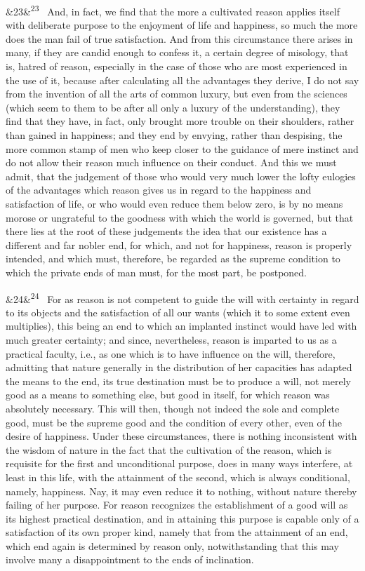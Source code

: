 \documentclass[12pt]{article}
\newcommand{\para}[1][]{\par\noindent\ifx&#1&\else\textsuperscript{\footnotesize #1}~\fi}
\begin{document}
\para[23] And, in fact, we find that the more a cultivated reason applies itself with deliberate purpose to the enjoyment of life and happiness, so much the more does the man fail of true satisfaction. And from this circumstance there arises in many, if they are candid enough to confess it, a certain degree of misology, that is, hatred of reason, especially in the case of those who are most experienced in the use of it, because after calculating all the advantages they derive, I do not say from the invention of all the arts of common luxury, but even from the sciences (which seem to them to be after all only a luxury of the understanding), they find that they have, in fact, only brought more trouble on their shoulders, rather than gained in happiness; and they end by envying, rather than despising, the more common stamp of men who keep closer to the guidance of mere instinct and do not allow their reason much influence on their conduct. And this we must admit, that the judgement of those who would very much lower the lofty eulogies of the advantages which reason gives us in regard to the happiness and satisfaction of life, or who would even reduce them below zero, is by no means morose or ungrateful to the goodness with which the world is governed, but that there lies at the root of these judgements the idea that our existence has a different and far nobler end, for which, and not for happiness, reason is properly intended, and which must, therefore, be regarded as the supreme condition to which the private ends of man must, for the most part, be postponed.

\para[24] For as reason is not competent to guide the will with certainty in regard to its objects and the satisfaction of all our wants (which it to some extent even multiplies), this being an end to which an implanted instinct would have led with much greater certainty; and since, nevertheless, reason is imparted to us as a practical faculty, i.e., as one which is to have influence on the will, therefore, admitting that nature generally in the distribution of her capacities has adapted the means to the end, its true destination must be to produce a will, not merely good as a means to something else, but good in itself, for which reason was absolutely necessary. This will then, though not indeed the sole and complete good, must be the supreme good and the condition of every other, even of the desire of happiness. Under these circumstances, there is nothing inconsistent with the wisdom of nature in the fact that the cultivation of the reason, which is requisite for the first and unconditional purpose, does in many ways interfere, at least in this life, with the attainment of the second, which is always conditional, namely, happiness. Nay, it may even reduce it to nothing, without nature thereby failing of her purpose. For reason recognizes the establishment of a good will as its highest practical destination, and in attaining this purpose is capable only of a satisfaction of its own proper kind, namely that from the attainment of an end, which end again is determined by reason only, notwithstanding that this may involve many a disappointment to the ends of inclination.
\end{document}

